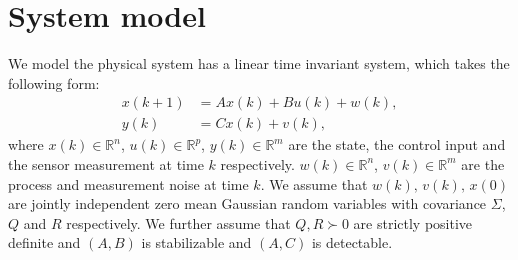 \section{System model} \label{sec:model}
We model the physical system has a linear time invariant system, which takes the following form:
\begin{align}
  \label{eq:systemdescription}
  x(k+1) &= Ax(k) + Bu(k) +  w(k), \\
  y(k) &= C x(k) + v(k),
  \label{eq:sensordescription}
\end{align}
where $x(k) \in \mathbb R^n$, $u(k)\in \mathbb R^p$, $y(k)\in \mathbb R^m$ are the state, the control input and the sensor measurement at time $k$ respectively. $w(k)\in \mathbb R^n$, $v(k)\in \mathbb R^m$ are the process and measurement noise at time $k$. We assume that $w(k),\,v(k),\,x(0)$ are jointly independent zero mean Gaussian random variables with covariance $\Sigma$, $Q$ and $R$ respectively. We further assume that $Q,R\succ 0$ are strictly positive definite and $(A,B)$ is stabilizable and $(A,C)$ is detectable.



